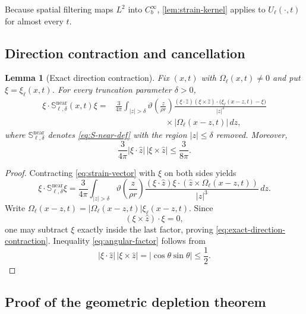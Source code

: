 \documentclass[11pt]{article}
\numberwithin{equation}{section}
\theoremstyle{plain}
\newtheorem{lemma}[theorem]{Lemma}
\theoremstyle{definition}
\theoremstyle{remark}
\begin{document}
Because spatial filtering maps $L^2$ into $C_b^\infty$, \cref{lem:strain-kernel} applies to $U_\ell(\cdot,t)$ for almost every $t$.

\subsection{Direction contraction and cancellation}

\begin{lemma}[Exact direction contraction]\label{lem:direction-contraction}
Fix $(x,t)$ with $\Omega_\ell(x,t)\ne0$ and put $\xi=\xi_\ell(x,t)$. For every truncation parameter $\delta>0$,
\begin{align}
\xi\cdot\mathbb S_{\ell,\delta}^{\mathrm{near}}(x,t)\xi
={}&
\frac{3}{4\pi}
\int_{|z|>\delta}
\vartheta\!\left(\frac z{\rho r}\right)
\frac{(\xi\cdot\widehat z)
(\xi\times\widehat z)\cdot
\bigl(\xi_\ell(x-z,t)-\xi\bigr)}{|z|^3}
\nonumber\\
&\hspace{6em}\times
|\Omega_\ell(x-z,t)|\,dz,
\label{eq:exact-direction-contraction}
\end{align}
where $\mathbb S_{\ell,\delta}^{\mathrm{near}}$ denotes \eqref{eq:S-near-def} with the region $|z|\le\delta$ removed.
Moreover,
\begin{equation}\label{eq:angular-factor}
\frac{3}{4\pi}|\xi\cdot\widehat z|\,|\xi\times\widehat z|
\le \frac{3}{8\pi}.
\end{equation}
\end{lemma}

\begin{proof}
Contracting \eqref{eq:strain-vector} with $\xi$ on both sides yields
\[
\xi\cdot\mathbb S_{\ell,\delta}^{\mathrm{near}}\xi
=
\frac{3}{4\pi}
\int_{|z|>\delta}
\vartheta\!\left(\frac z{\rho r}\right)
\frac{(\xi\cdot\widehat z)
\xi\cdot(\widehat z\times\Omega_\ell(x-z,t))}{|z|^3}\,dz.
\]
Write $\Omega_\ell(x-z,t)=|\Omega_\ell(x-z,t)|\xi_\ell(x-z,t)$. Since
\[
(\xi\times\widehat z)\cdot\xi=0,
\]
one may subtract $\xi$ exactly inside the last factor, proving \eqref{eq:exact-direction-contraction}. Inequality \eqref{eq:angular-factor} follows from
\[
|\xi\cdot\widehat z|\,|\xi\times\widehat z|
=|\cos\theta\sin\theta|\le\frac12.
\]
\end{proof}

\subsection{Proof of the geometric depletion theorem}
\end{document}
